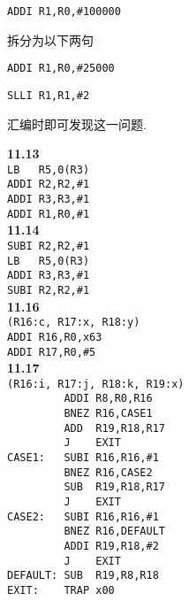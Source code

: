 \documentclass[UTF8]{ctexart}
\begin{document}
{\centering \texttt{ADDI R1,R0,\#100000}

}

\noindent 拆分为以下两句

{\centering \texttt{ADDI R1,R0,\#25000\ }

\texttt{SLLI R1,R1,\#2\ \ \ \ \ }

}

\noindent 汇编时即可发现这一问题.

\noindent\textbf{11.13}\\
\indent\texttt{LB\ \ \ R5,0(R3)}\\
\indent\texttt{ADDI R2,R2,\#1}\\
\indent\texttt{ADDI R3,R3,\#1}\\
\indent\texttt{ADDI R1,R0,\#1}\\
\noindent\textbf{11.14}\\
\indent\texttt{SUBI R2,R2,\#1}\\
\indent\texttt{LB\ \ \ R5,0(R3)}\\
\indent\texttt{ADDI R3,R3,\#1}\\
\indent\texttt{SUBI R2,R2,\#1}\\
\noindent\textbf{11.16}\\
\indent\texttt{(R16:c, R17:x, R18:y)}\\
\indent\texttt{ADDI R16,R0,x63}\\
\indent\texttt{ADDI R17,R0,\#5}\\
\noindent\textbf{11.17}\\
\indent\texttt{(R16:i, R17:j, R18:k, R19:x)}\\
\indent\texttt{\ \ \ \ \ \ \ \ \ ADDI R8,R0,R16}\\
\indent\texttt{\ \ \ \ \ \ \ \ \ BNEZ R16,CASE1}\\
\indent\texttt{\ \ \ \ \ \ \ \ \ ADD\ \ R19,R18,R17}\\
\indent\texttt{\ \ \ \ \ \ \ \ \ J\ \ \ \ EXIT}\\
\indent\texttt{CASE1:\ \ \ SUBI R16,R16,\#1}\\
\indent\texttt{\ \ \ \ \ \ \ \ \ BNEZ R16,CASE2}\\
\indent\texttt{\ \ \ \ \ \ \ \ \ SUB\ \ R19,R18,R17}\\
\indent\texttt{\ \ \ \ \ \ \ \ \ J\ \ \ \ EXIT}\\
\indent\texttt{CASE2:\ \ \ SUBI R16,R16,\#1}\\
\indent\texttt{\ \ \ \ \ \ \ \ \ BNEZ R16,DEFAULT}\\
\indent\texttt{\ \ \ \ \ \ \ \ \ ADDI R19,R18,\#2}\\
\indent\texttt{\ \ \ \ \ \ \ \ \ J\ \ \ \ EXIT}\\
\indent\texttt{DEFAULT: SUB\ \ R19,R8,R18}\\
\indent\texttt{EXIT:\ \ \ \ TRAP x00}\\
\end{document}

